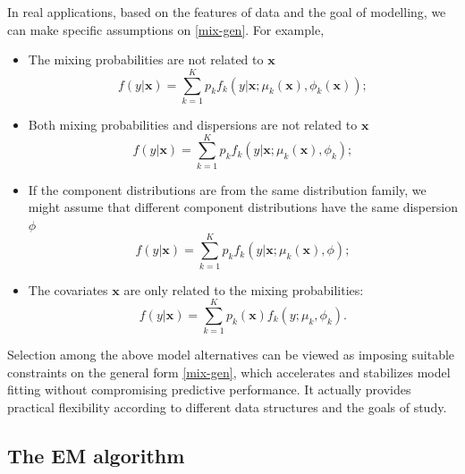 \documentclass[11pt]{article}
\numberwithin{equation}{section}
\def\bx{\boldsymbol{x}}
\begin{document}
	 In real applications,  based on the features of data and the goal of modelling, we can make specific assumptions on \eqref{mix-gen}. For example,
	\begin{itemize}
		\item The mixing probabilities are not related to $\bx$
		$$f(y|\bx)=\sum_{k=1}^Kp_kf_k(y|\bx;\mu_k(\bx),\phi_k(\bx));$$
		\item Both mixing probabilities and dispersions are not related to $\bx$
		$$f(y|\bx)=\sum_{k=1}^Kp_kf_k(y|\bx;\mu_k(\bx),\phi_k);$$

		\item If the component distributions are from the same distribution family, we might assume that different component distributions have the same dispersion $\phi$
		$$f(y|\bx)=\sum_{k=1}^Kp_kf_k(y|\bx;\mu_k(\bx),\phi);$$
		\item The covariates $\bx$ are only related to the mixing probabilities:
		$$f(y|\bx)=\sum_{k=1}^Kp_k(\bx)f_k(y;\mu_k,\phi_k).$$
	\end{itemize}
	Selection among the above model alternatives can be viewed as imposing suitable constraints on the general form \eqref{mix-gen}, which accelerates and stabilizes model fitting without compromising predictive performance. It actually provides practical flexibility according to different data structures and the goals of study.

\subsection{The EM algorithm}
\end{document}
